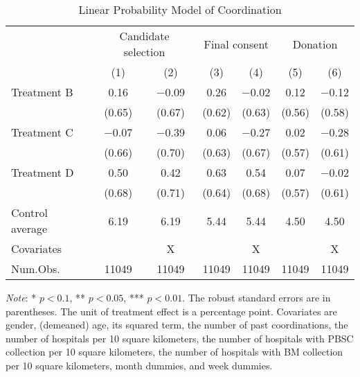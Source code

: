 \documentclass[12pt, a4paper]{article}
\begin{document}
\begin{table}[H]

\caption{\label{tab:coordinate-reg}Linear Probability Model of Coordination}
\centering
\fontsize{9}{11}\selectfont
\begin{threeparttable}
\begin{tabular}[t]{lcccccc}
\toprule
\multicolumn{1}{c}{ } & \multicolumn{2}{c}{Candidate selection} & \multicolumn{2}{c}{Final consent} & \multicolumn{2}{c}{Donation} \\
\cmidrule(l{3pt}r{3pt}){2-3} \cmidrule(l{3pt}r{3pt}){4-5} \cmidrule(l{3pt}r{3pt}){6-7}
  & (1) & (2) & (3) & (4) & (5) & (6)\\
\midrule
Treatment B & \num{0.16} & \num{-0.09} & \num{0.26} & \num{-0.02} & \num{0.12} & \num{-0.12}\\
 & (\num{0.65}) & (\num{0.67}) & (\num{0.62}) & (\num{0.63}) & (\num{0.56}) & (\num{0.58})\\
Treatment C & \num{-0.07} & \num{-0.39} & \num{0.06} & \num{-0.27} & \num{0.02} & \num{-0.28}\\
 & (\num{0.66}) & (\num{0.70}) & (\num{0.63}) & (\num{0.67}) & (\num{0.57}) & (\num{0.61})\\
Treatment D & \num{0.50} & \num{0.42} & \num{0.63} & \num{0.54} & \num{0.07} & \num{-0.02}\\
 & (\num{0.68}) & (\num{0.71}) & (\num{0.64}) & (\num{0.68}) & (\num{0.57}) & (\num{0.61})\\
\midrule
Control average & 6.19 & 6.19 & 5.44 & 5.44 & 4.50 & 4.50\\
Covariates &  & X &  & X &  & X\\
Num.Obs. & \num{11049} & \num{11049} & \num{11049} & \num{11049} & \num{11049} & \num{11049}\\
\bottomrule
\end{tabular}
\begin{tablenotes}
\item \emph{Note}: * $p < 0.1$, ** $p < 0.05$, *** $p < 0.01$. The robust standard errors are in parentheses. The unit of treatment effect is a percentage point. Covariates are gender, (demeaned) age, its squared term, the number of past coordinations, the number of hospitals per 10 square kilometers, the number of hospitals with PBSC collection per 10 square kilometers, the number of hospitals with BM collection per 10 square kilometers, month dummies, and week dummies.
\end{tablenotes}
\end{threeparttable}
\end{table}
\end{document}
